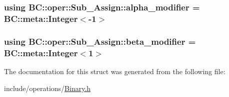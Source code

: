\subsubsection[{\texorpdfstring{alpha\+\_\+modifier}{alpha_modifier}}]{\setlength{\rightskip}{0pt plus 5cm}using {\bf B\+C\+::oper\+::\+Sub\+\_\+\+Assign\+::alpha\+\_\+modifier} =  {\bf B\+C\+::meta\+::\+Integer}$<$-\/1$>$}\hypertarget{structBC_1_1oper_1_1Sub__Assign_a8ccc3c285ceb7b78ea55adbf49a6d4fa}{}\label{structBC_1_1oper_1_1Sub__Assign_a8ccc3c285ceb7b78ea55adbf49a6d4fa}
\subsubsection[{\texorpdfstring{beta\+\_\+modifier}{beta_modifier}}]{\setlength{\rightskip}{0pt plus 5cm}using {\bf B\+C\+::oper\+::\+Sub\+\_\+\+Assign\+::beta\+\_\+modifier} =  {\bf B\+C\+::meta\+::\+Integer}$<$1$>$}\hypertarget{structBC_1_1oper_1_1Sub__Assign_a6bb49229c9eba5a10a7c265c0f8715e3}{}\label{structBC_1_1oper_1_1Sub__Assign_a6bb49229c9eba5a10a7c265c0f8715e3}


The documentation for this struct was generated from the following file\+:\begin{DoxyCompactItemize}
\item 
include/operations/\hyperlink{Binary_8h}{Binary.\+h}\end{DoxyCompactItemize}
